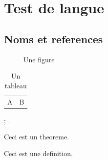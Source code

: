 \documentclass[fr, font = none, mode = simple]{elegantbook-l3}
\begin{document}
\frontmatter
\tableofcontents

\mainmatter
\chapter{Test de langue}
\section{Noms et references}

\begin{figure}[htbp]
  \centering
  \fbox{\rule{0pt}{2cm}\rule{3cm}{0pt}}
  \caption{Une figure}\label{fig:language-test}
\end{figure}

\begin{table}[htbp]
  \centering
  \caption{Un tableau}\label{tab:language-test}
  \begin{tabular}{cc}
    A & B
  \end{tabular}
\end{table}

; .

\begin{theorem}[Exemple]
  Ceci est un theoreme.
\end{theorem}

\begin{definition}
  Ceci est une definition.
\end{definition}
\end{document}

